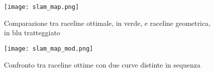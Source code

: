 \begin{figure}[H]
	\begin{minipage}[c]{0.5\textwidth}
		\texttt{[image: slam\_map.png]}
		\caption{Comparazione tra raceline ottimale, in verde, e raceline geometrica, in blu tratteggiato}
		\label{fig:slam_map}
	\end{minipage}\hfill
	\begin{minipage}[c]{0.45\textwidth}
		\texttt{[image: slam\_map\_mod.png]}
		\caption{Confronto tra raceline ottime con due curve distinte in sequenza}
		\label{fig:slam_map_mod}
	\end{minipage}
\end{figure}

